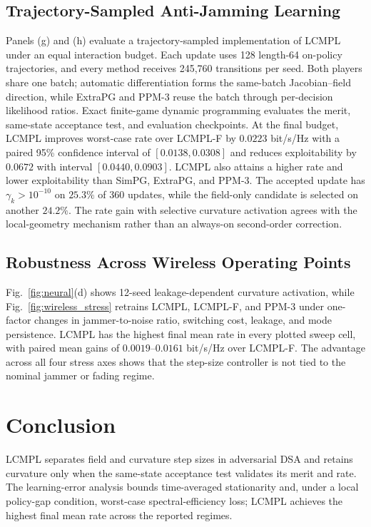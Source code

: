\documentclass[conference]{IEEEtran}
\begin{document}
\subsection{Trajectory-Sampled Anti-Jamming Learning}
Panels (g) and (h) evaluate a trajectory-sampled implementation of LCMPL under an equal interaction budget.
Each update uses 128 length-64 on-policy trajectories, and every method receives 245,760 transitions per seed.
Both players share one batch; automatic differentiation forms the same-batch Jacobian--field direction, while ExtraPG and PPM-3 reuse the batch through per-decision likelihood ratios.
Exact finite-game dynamic programming evaluates the merit, same-state acceptance test, and evaluation checkpoints.
At the final budget, LCMPL improves worst-case rate over LCMPL-F by $0.0223$ bit/s/Hz with a paired 95\% confidence interval of $[0.0138,0.0308]$ and reduces exploitability by $0.0672$ with interval $[0.0440,0.0903]$.
LCMPL also attains a higher rate and lower exploitability than SimPG, ExtraPG, and PPM-3.
The accepted update has $\gamma_k>10^{-10}$ on $25.3\%$ of 360 updates, while the field-only candidate is selected on another $24.2\%$.
The rate gain with selective curvature activation agrees with the local-geometry mechanism rather than an always-on second-order correction.

\subsection{Robustness Across Wireless Operating Points}
Fig.~\ref{fig:neural}(d) shows 12-seed leakage-dependent curvature activation, while Fig.~\ref{fig:wireless_stress} retrains LCMPL, LCMPL-F, and PPM-3 under one-factor changes in jammer-to-noise ratio, switching cost, leakage, and mode persistence.
LCMPL has the highest final mean rate in every plotted sweep cell, with paired mean gains of $0.0019$--$0.0161$ bit/s/Hz over LCMPL-F.
The advantage across all four stress axes shows that the step-size controller is not tied to the nominal jammer or fading regime.

\section{Conclusion}
LCMPL separates field and curvature step sizes in adversarial DSA and retains curvature only when the same-state acceptance test validates its merit and rate.
The learning-error analysis bounds time-averaged stationarity and, under a local policy-gap condition, worst-case spectral-efficiency loss; LCMPL achieves the highest final mean rate across the reported regimes.



\end{document}
